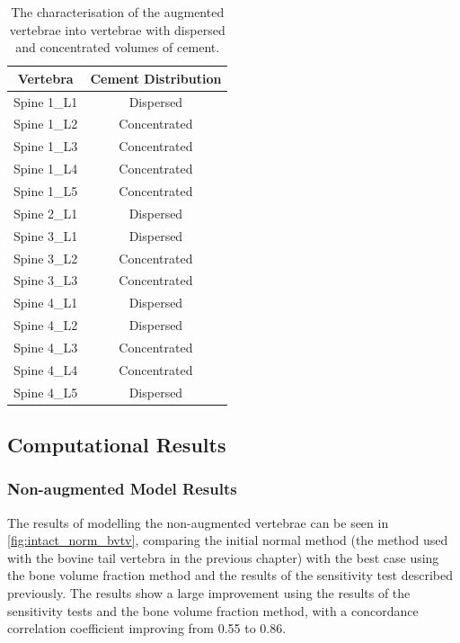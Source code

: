 \begin{table}[h!]
	\caption{The characterisation of the augmented vertebrae into vertebrae with
dispersed and concentrated volumes of cement.}
	\label{tab:conc_disp}
	\centering
	\begin{tabular}{c|c}
    Vertebra & Cement Distribution \\
    \hline
    \hline

    Spine 1\_L1 & Dispersed \\
    Spine 1\_L2 & Concentrated\\
    Spine 1\_L3 & Concentrated\\
    Spine 1\_L4 & Concentrated\\
    Spine 1\_L5 & Concentrated\\
    Spine 2\_L1 & Dispersed \\
    Spine 3\_L1 & Dispersed \\
    Spine 3\_L2 & Concentrated\\
    Spine 3\_L3 & Concentrated\\
    Spine 4\_L1 & Dispersed \\
    Spine 4\_L2 & Dispersed \\
    Spine 4\_L3 & Concentrated\\
    Spine 4\_L4 & Concentrated\\
    Spine 4\_L5 & Dispersed \\
    \hline
	\end{tabular}
\end{table}



\subsection{Computational Results}


\subsubsection{Non-augmented Model Results}

The results of modelling the non-augmented vertebrae can be seen in
\cref{fig:intact_norm_bvtv}, comparing the initial normal method (the method
used with the bovine tail vertebra in the previous chapter) with the best case
using the bone volume fraction method and the results of the sensitivity test
described previously.
The results show a large improvement using the results of the sensitivity tests
and the bone volume fraction method, with a concordance correlation coefficient
improving from 0.55 to 0.86.

